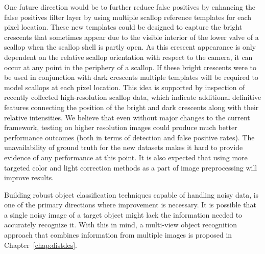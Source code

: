 One future direction would be to further reduce false positives by enhancing the false positives filter layer by using multiple scallop reference templates for each pixel location. 
These new templates could be designed to capture the bright crescents that sometimes appear due to the visible interior of the lower valve of a scallop when the scallop shell is partly open. As this crescent appearance is only dependent on the relative scallop orientation with respect to the camera, it can occur at any point in the periphery of a scallop. If these bright crescents were to be used in conjunction with dark crescents multiple templates will be required to model scallops at each pixel location.
This idea is supported by inspection of recently collected high-resolution scallop data, which indicate additional definitive features connecting the position of the bright and dark crescents along with their relative intensities. 
We believe that even without major changes to the current framework, testing on higher resolution images could produce much better performance outcomes (both in terms of detection and false positive rates). 
The unavailability of ground truth for the new datasets makes it hard to provide evidence of any performance at this point. 
It is also expected that using more targeted color and light correction methods \cite{dawkings13} as a part of image preprocessing will improve results.

Building robust object classification techniques capable of handling noisy data, is one of the primary directions where improvement is necessary. It is possible that a single noisy image of a target object might lack the information needed to accurately recognize it. With this in mind, a multi-view object recognition approach that combines information from multiple images is proposed in Chapter~\ref{chap:distdes}.


